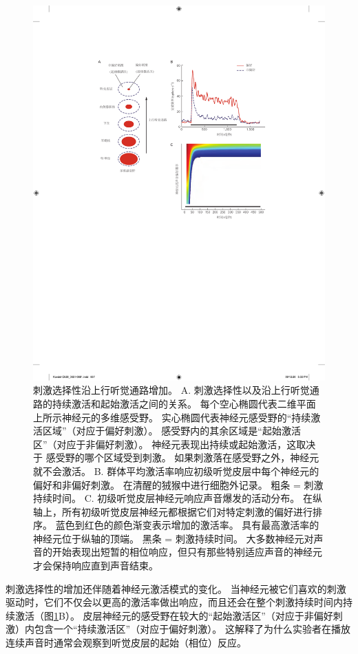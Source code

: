 \begin{figure}[htbp]
	\centering
	\includegraphics[width=0.75\linewidth]{chap28/fig_28_9}
	\caption{刺激选择性沿上行听觉通路增加。 
		A. 刺激选择性以及沿上行听觉通路的持续激活和起始激活之间的关系。 
		每个空心椭圆代表二维平面上所示神经元的多维感受野。 
		实心椭圆代表神经元感受野的“持续激活区域”（对应于偏好刺激）。 
		感受野内的其余区域是“起始激活区”（对应于非偏好刺激）。 
		神经元表现出持续或起始激活，这取决于 感受野的哪个区域受到刺激。 
		如果刺激落在感受野之外，神经元就不会激活\cite{wang2018cortical}。
		B. 群体平均激活率响应初级听觉皮层中每个神经元的偏好和非偏好刺激。 
		在清醒的狨猴中进行细胞外记录。 
		粗条 = 刺激持续时间\cite{wang2005sustained}。 
		C. 初级听觉皮层神经元响应声音爆发的活动分布。 
		在纵轴上，所有初级听觉皮层神经元都根据它们对特定刺激的偏好进行排序。 
		蓝色到红色的颜色渐变表示增加的激活率。 
		具有最高激活率的神经元位于纵轴的顶端。 
		黑条 = 刺激持续时间。 
		大多数神经元对声音的开始表现出短暂的相位响应，但只有那些特别适应声音的神经元才会保持响应直到声音结束\cite{middlebrooks2005auditory}。 }
	\label{fig:28_9}
\end{figure}

刺激选择性的增加还伴随着神经元激活模式的变化。 
当神经元被它们喜欢的刺激驱动时，它们不仅会以更高的激活率做出响应，而且还会在整个刺激持续时间内持续激活（图\ref{fig:28_9}B）。 
皮层神经元的感受野在较大的“起始激活区”（对应于非偏好刺激）内包含一个“持续激活区”（对应于偏好刺激）。 
这解释了为什么实验者在播放连续声音时通常会观察到听觉皮层的起始（相位）反应。


